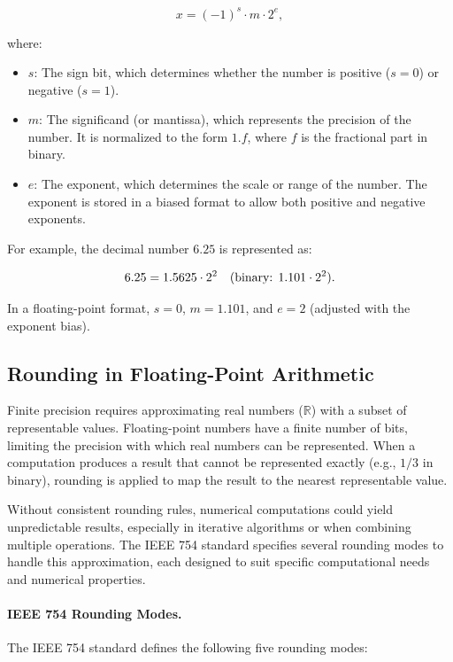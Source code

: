 \[
x = (-1)^s \cdot m \cdot 2^e,
\]

where:
\begin{itemize}[noitemsep]
    \item \( s \): The sign bit, which determines whether the number is positive (\( s = 0 \)) or negative (\( s = 1 \)).
    \item \( m \): The significand (or mantissa), which represents the precision of the number. It is normalized to the form \( 1.f \), where \( f \) is the fractional part in binary.
    \item \( e \): The exponent, which determines the scale or range of the number. The exponent is stored in a biased format to allow both positive and negative exponents.
\end{itemize}

For example, the decimal number \( 6.25 \) is represented as:

\[
6.25 = 1.5625 \cdot 2^2 \quad \text{(binary: \( 1.101 \cdot 2^2 \))}.
\]

In a floating-point format, \( s = 0 \), \( m = 1.101 \), and \( e = 2 \) (adjusted with the exponent bias).

\subsection{Rounding in Floating-Point Arithmetic}
Finite precision requires approximating real numbers (\( \mathbb{R} \)) with a subset of representable values. Floating-point numbers have a finite number of bits, limiting the precision with which real numbers can be represented. When a computation produces a result that cannot be represented exactly (e.g., \( 1/3 \) in binary), rounding is applied to map the result to the nearest representable value.

Without consistent rounding rules, numerical computations could yield unpredictable results, especially in iterative algorithms or when combining multiple operations. The IEEE 754 standard specifies several rounding modes to handle this approximation, each designed to suit specific computational needs and numerical properties.

\paragraph{IEEE 754 Rounding Modes.}
The IEEE 754 standard defines the following five rounding modes:


